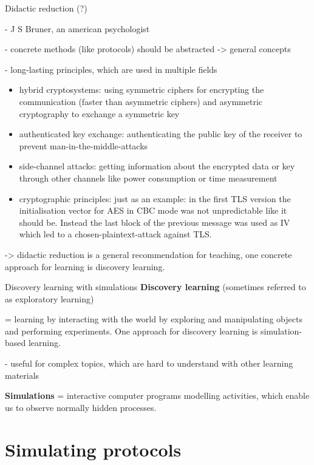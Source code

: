 \begin{frame}{Didactic reduction (?)}

- J S Bruner, an american psychologist

- concrete methods (like protocols) should be abstracted -> general concepts

- long-lasting principles, which are used in multiple fields

	\begin{itemize}
		\item hybrid cryptosystems: using symmetric ciphers for encrypting the communication (faster than asymmetric ciphers) and asymmetric cryptography to exchange a symmetric key
		\item authenticated key exchange: authenticating the public key of the receiver to prevent man-in-the-middle-attacks
		\item side-channel attacks: getting information about the encrypted data or key through other channels like power consumption or time measurement
		\item cryptographic principles: just as an example: in the first TLS version the initialisation vector for AES in CBC mode was not unpredictable like it should be. Instead the last block of the previous message was used as IV which led to a chosen-plaintext-attack against TLS.
	\end{itemize}

-> didactic reduction is a general recommendation for teaching, one concrete approach for learning is discovery learning.
\end{frame}

\begin{frame}{Discovery learning with simulations}
\textbf{Discovery learning} (sometimes referred to as exploratory learning)

= learning by interacting with the world by exploring and manipulating objects and performing experiments. One approach for discovery learning is simulation-based learning.

- useful for complex topics, which are hard to understand with other learning materials

\textbf{Simulations}
= interactive computer programs modelling activities, which enable us to observe normally hidden processes.

\end{frame}

\section{Simulating protocols}

